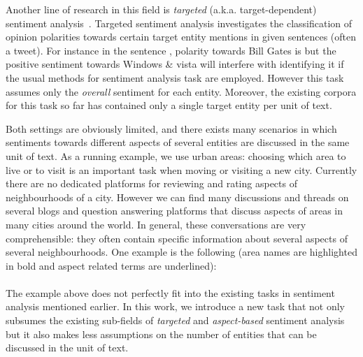 \documentclass[11pt]{article}
\begin{document}
    Another line of research in this field is \emph{targeted} (a.k.a. target-dependent) sentiment analysis~\cite{jiang2011target,vo2015target}. Targeted sentiment analysis investigates the classification of opinion polarities towards certain target entity mentions in given sentences (often a tweet). For instance in the sentence , polarity towards Bill Gates is  but the positive sentiment towards Windows \& vista will interfere with identifying it if the usual methods for sentiment analysis task are employed. However this task assumes only the \emph{overall} sentiment for each entity. Moreover, the existing corpora for this task so far has contained only a single target entity per unit of text.
    
    Both settings are obviously limited, and there exists many scenarios in which sentiments towards different aspects of several entities are discussed in the same unit of text. As a running example, we use urban areas: choosing which area to live or to visit is an important task when moving or visiting a new city. Currently there are no dedicated platforms for reviewing and rating aspects of neighbourhoods of a city. However we can find many discussions and threads on several blogs and question answering platforms that discuss aspects of areas in many cities around the world. In general, these conversations are very comprehensible: they often contain specific information about several aspects of several neighbourhoods. One example is the following (area names are highlighted in bold and aspect related terms are underlined): \\
    
    \\
    
    The example above does not perfectly fit into the existing tasks in sentiment analysis mentioned earlier. In this work, we introduce a new task that not only subsumes the existing sub-fields of \emph{targeted} and \emph{aspect-based} sentiment analysis but it also makes less assumptions on the number of entities that can be discussed in the unit of text. 
    
\end{document}

